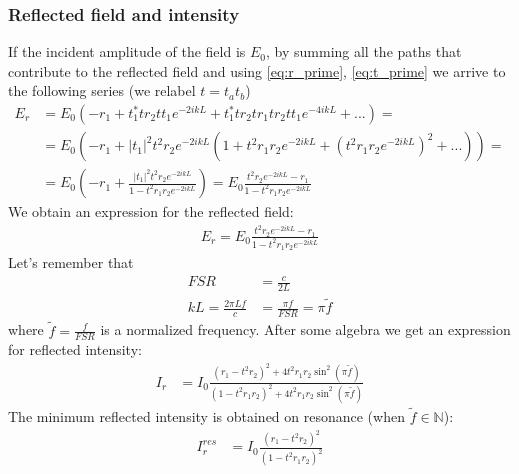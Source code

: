 \documentclass{article}
\numberwithin{equation}{section}
\begin{document}
\subsubsection{Reflected field and intensity}
If the incident amplitude of the field is $E_0$, by summing all the paths that contribute to the reflected field and using \ref{eq:r_prime}, \ref{eq:t_prime} we arrive to the following series (we relabel $t = t_a t_b$)
\begin{align*}
    E_r &= E_0 ( -r_1 + t^*_1 t r_2 t t_1 e^{-2ikL} + t^*_1 t r_2 t r_1 t r_2 t t_1 e^{-4ikL} + ...) = \\
    &= E_0 ( -r_1 + |t_1|^2 t^2 r_2 e^{-2ikL} (1 + t^2 r_1 r_2 e^{-2ikL} + (t^2 r_1 r_2 e^{-2ikL})^2 + ...)) = \\
    &= E_0 (-r_1 + \frac{|t_1|^2 t^2 r_2 e^{-2ikL}}{1 - t^2 r_1 r_2 e^{-2ikL}}) =  E_0 \frac{t^2 r_2 e^{-2ikL} - r_1}{1 - t^2 r_1 r_2 e^{-2ikL}}
\end{align*}
We obtain an expression for the reflected field:
\begin{align}
    E_r = E_0\frac{t^2 r_2 e^{-2ikL} - r_1}{1 - t^2 r_1 r_2 e^{-2ikL}} \label{eq:E_r}
\end{align}
Let's remember that
\begin{align}
    FSR &= \frac{c}{2L} \\
    kL = \frac{2 \pi L f}{c} &= \frac{\pi f}{FSR} = \pi \tilde{f}
\end{align}
where $\tilde{f} = \frac{f}{FSR}$ is a normalized frequency. After some algebra we get an expression for reflected intensity:
\begin{align}
    I_r &= I_0 \frac{(r_1 - t^2 r_2)^2 + 4t^2 r_1 r_2 \sin^2 (\pi \tilde{f})}{(1-t^2 r_1 r_2)^2 + 4 t^2 r_1 r_2 \sin^2 (\pi \tilde{f})}
\end{align}
The minimum reflected intensity is obtained on resonance (when $\tilde{f} \in \mathbb{N}$):
\begin{align}
    I_r^{res} &= I_0 \frac{(r_1 - t^2 r_2)^2}{(1 - t^2 r_1 r_2)^2}
\end{align}
\end{document}
